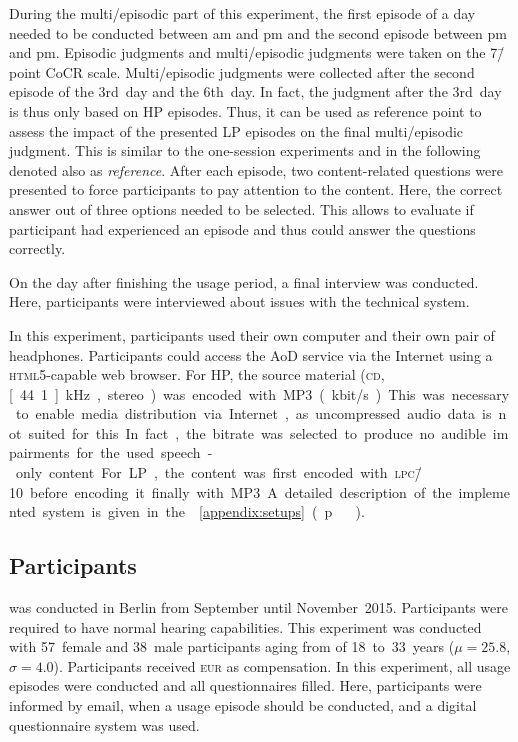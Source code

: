 During the multi\-/episodic part of this experiment, the first episode of a day needed to be conducted between \unit[7]{am} and \unit[1]{pm} and the second episode between \unit[3]{pm} and \unit[10]{pm}.
Episodic judgments and multi\-/episodic judgments were taken on the 7\=/point \ac{CoCR} scale.
Multi\-/episodic judgments were collected after the second episode of the 3rd~day and the 6th~day.
In fact, the judgment after the 3rd~day is thus only based on \ac{HP} episodes.
Thus, it can be used as reference point to assess the impact of the presented \ac{LP} episodes on the final multi\-/episodic judgment.
This is similar to the one-session experiments and in the following denoted also as \emph{reference}.
After each episode, two content-related questions were presented to force participants to pay attention to the content.
Here, the correct answer out of three options needed to be selected.
This allows to evaluate if participant had experienced an episode and thus could answer the questions correctly.

On the day after finishing the usage period, a final interview was conducted.
Here, participants were interviewed about issues with the technical system.

In this experiment, participants used their own computer and their own pair of headphones.
Participants could access the \ac{AoD} service via the Internet using a \textsc{\lowercase{HTML5}}-capable web browser.
For \ac{HP}, the source material (\textsc{\lowercase{CD}}, \unit[44.1]{kHz}, stereo) was encoded with \ac{MP3} (\unit[192]{kbit/s}).
This was necessary to enable media distribution via Internet, as uncompressed audio data is not suited for this.
In fact, the bitrate was selected to produce no audible impairments for the used speech-only content.
For \ac{LP}, the content was first encoded with \textsc{\lowercase{LPC\=/10}} before encoding it finally with \ac{MP3}.
A detailed description of the implemented system is given in the \appendix{}~\ref{appendix:setups} (p.\,\pageref{appendix:setups}).

\subsection{Participants}
 was conducted in Berlin from September until November~2015.
Participants were required to have normal hearing capabilities.
This experiment was conducted with 57~female and 38~male participants aging from of 18~to~33~years ($\mu=25.8$, $\sigma=4.0$). %
Participants received \unit[20]{\textsc{\lowercase{EUR}}} as compensation.
In this experiment, all usage episodes were conducted and all questionnaires filled.
Here, participants were informed by email, when a usage episode should be conducted, and a digital questionnaire system was used.



